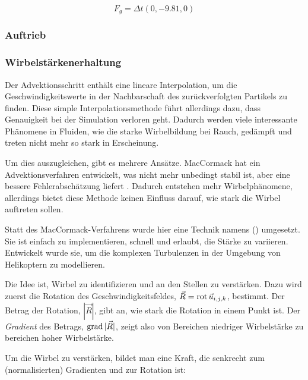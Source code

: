 \begin{equation}
F_g = \Delta t (0,-9.81,0)
\end{equation}

\subsubsection{Auftrieb}


\subsubsection{Wirbelstärkenerhaltung}

Der Advektionsschritt enthält eine lineare Interpolation, um die
Geschwindigkeitswerte in der Nachbarschaft des zurückverfolgten Partikels zu
finden. Diese simple Interpolationsmethode führt allerdings dazu, dass
Genauigkeit bei der Simulation verloren geht. Dadurch werden viele interessante
Phänomene in Fluiden, wie die starke Wirbelbildung bei Rauch, gedämpft und
treten nicht mehr so stark in Erscheinung.

Um dies auszugleichen, gibt es mehrere Ansätze. MacCormack hat ein
Advektionsverfahren entwickelt, was nicht mehr unbedingt stabil ist, aber eine
bessere Fehlerabschätzung liefert \cite{Selle2008}\cite{Crane2007}. Dadurch
entstehen mehr Wirbelphänomene, allerdings bietet diese Methode keinen Einfluss
darauf, wie stark die Wirbel auftreten sollen.

Statt des MacCormack-Verfahrens wurde hier eine Technik namens
 () umgesetzt. Sie ist einfach zu implementieren, schnell und
erlaubt, die Stärke zu variieren. Entwickelt wurde sie, um die komplexen
Turbulenzen in der Umgebung von Helikoptern zu modellieren\cite{Steinhoff1994}.

Die Idee ist, Wirbel zu identifizieren und an den 
Stellen zu verstärken. Dazu wird zuerst die Rotation des Geschwindigkeitsfeldes,
$\vec{R} = \operatorname*{rot} \vec{u}_{i,j,k}$, bestimmt. Der Betrag der Rotation,
$|\vec{R}|$, gibt an, wie stark die Rotation in einem Punkt ist. Der
\emph{Gradient} des Betrags, $\operatorname*{grad} |\vec{R}|$, zeigt also
von Bereichen niedriger Wirbelstärke zu bereichen hoher Wirbelstärke.

Um die Wirbel zu verstärken, bildet man eine Kraft, die senkrecht zum
(normalisierten) Gradienten und zur Rotation ist:

